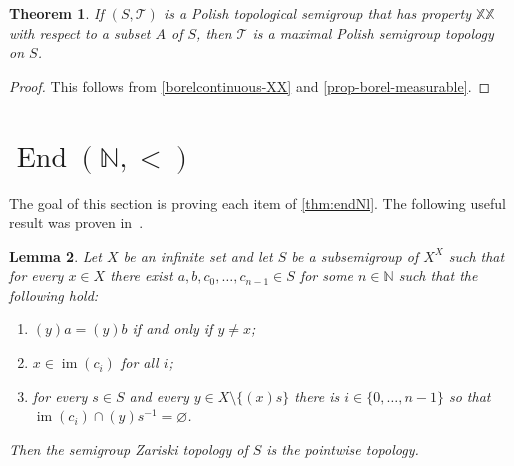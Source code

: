 \documentclass[11pt]{amsart}
\newtheorem{theorem}{Theorem}[section]
\newtheorem{lemma}[theorem]{Lemma}
\theoremstyle{definition}
\newcommand{\N}{\mathbb N}
\newcommand{\Tau}{\mathcal T}
\newcommand{\E}{\operatorname{End}}
\newcommand{\im}{\operatorname{im}}
\begin{document}
\begin{theorem}\label{cor:XX_main}
If \((S,\Tau)\) is a Polish topological semigroup that has property $\mathbb{XX}$ with respect to a subset \(A\) of \(S\), then $\Tau$ is a maximal Polish semigroup topology on $S$.
\end{theorem}
\begin{proof}
    This follows from \cref{borelcontinuous-XX} and \cref{prop-borel-measurable}.
\end{proof}


\section{$\E(\N,<)$}

The goal of this section is proving each item of
\cref{thm:endNl}.
The following useful result was proven in~\cite[Lemma 5.3]{main}.
\begin{lemma}\label{lem-zariski-pointwise}
  Let \(X\) be an infinite set and let \(S\) be a subsemigroup of \(X^X\) such
  that for every \(x \in X\) there exist \( a, b, c_{0}, \ldots, c_{n-1} \in S \)
  for some $n\in \N$ such that the following hold:
  \begin{enumerate}
    \item\label{lem-zariski-pointwise-i} 
    \((y)a = (y)b\) if and only if \(y \neq x\);

    \item\label{lem-zariski-pointwise-ii} 
          \(x \in \im(c_{i})\) for all \(i\);

    \item\label{lem-zariski-pointwise-iii} 
          for every \(s \in S\) and every \(y \in X\setminus \{(x)s\}\) there
          is \(i \in \{0, \ldots, n-1\}\) so that \( \im(c_{i}) \cap (y)s^{-1} =
          \varnothing\).
  \end{enumerate}
  Then the semigroup Zariski topology of \(S\) is the pointwise topology.
\end{lemma}
\end{document}
